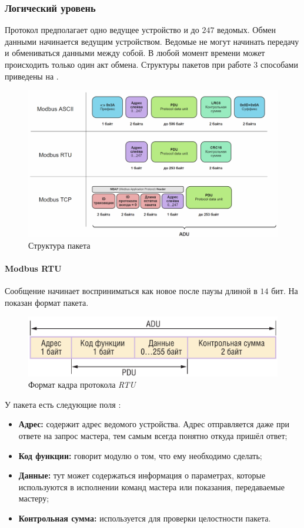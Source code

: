\documentclass[../AISTR.tex]{subfiles}
\begin{document}
\subsubsection{Логический уровень}
Протокол \mb предполагает одно ведущее устройство и до $247$ ведомых. Обмен данными начинается ведущим устройством. Ведомые не могут начинать передачу и обмениваться данными между собой. В любой момент времени может происходить только один акт обмена. Структуры пакетов \mb при работе 3 способами приведены на .
\begin{figure}
	\centering
	\includegraphics[width=0.9\linewidth]{../images/modbus_struct}
	\caption{Структура пакета \mb}
	\label{fig:modbusstruct}
\end{figure}


\paragraph{Modbus RTU} \label{par:modbusrtu}
Сообщение начинает восприниматься как новое после паузы длиной в $14$ бит. На  показан формат пакета.
\begin{figure}[h]
	\centering
	\includegraphics[width=\linewidth]{../images/modbus_PDU}
	\caption{Формат кадра протокола \mb \textit{RTU}}
	\label{fig:modbuspdu}
\end{figure}
У пакета есть следующие поля \cite{__2010}:
\begin{itemize}
	\item \textbf{Адрес:} содержит адрес ведомого устройства. Адрес отправляется даже при ответе на запрос мастера, тем самым всегда понятно откуда пришёл ответ;
	\item \textbf{Код функции:} говорит модулю о том, что ему необходимо сделать;
	\item \textbf{Данные:} тут может содержаться информация о параметрах, которые используются в исполнении команд мастера или показания, передаваемые мастеру;
	\item \textbf{Контрольная сумма:} используется для проверки целостности пакета.
\end{itemize}
\end{document}
